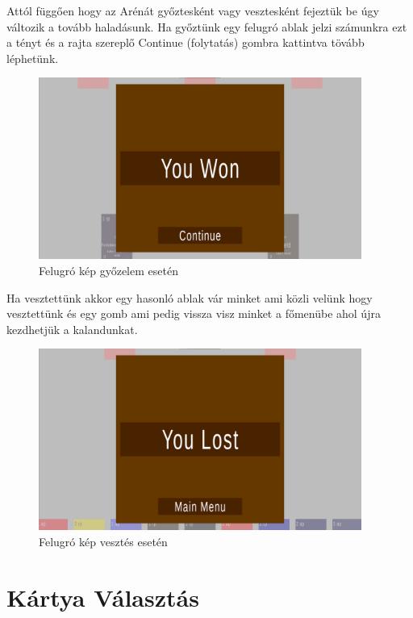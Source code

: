 Attól függően hogy az Arénát győztesként vagy vesztesként fejeztük be úgy változik a tovább haladásunk. Ha győztünk egy felugró ablak jelzi számunkra ezt a tényt és a rajta szereplő Continue (folytatás) gombra kattintva tövább léphetünk.

\begin{figure}[h]
        \centering
        \includegraphics[width=400px,keepaspectratio]{images/won.png}
        \caption {Felugró kép győzelem esetén}
        \label{Won}
    \hspace{1em}
\end{figure}

Ha vesztettünk akkor egy hasonló ablak vár minket ami közli velünk hogy vesztettünk és egy gomb ami pedig vissza visz minket a főmenübe ahol újra kezdhetjük a kalandunkat. 

\begin{figure}[h]
        \centering
        \includegraphics[width=400px,keepaspectratio]{images/lost.png}
        \caption {Felugró kép vesztés esetén}
        \label{lost}
    \hspace{1em}
\end{figure}

\clearpage
\section{Kártya Választás}

